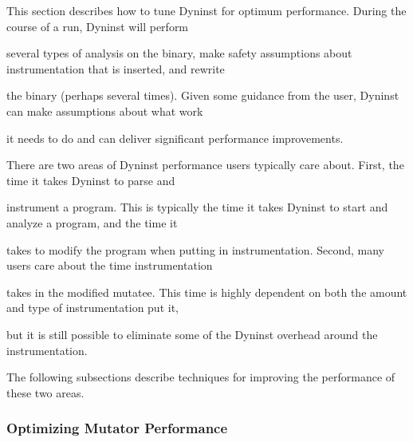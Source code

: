

\bigskip



{

This section describes how to tune Dyninst for optimum performance. During the course of a run, Dyninst will perform

several types of analysis on the binary, make safety assumptions about instrumentation that is inserted, and rewrite

the binary (perhaps several times). Given some guidance from the user, Dyninst can make assumptions about what work

it needs to do and can deliver significant performance improvements.}





\bigskip



{

There are two areas of Dyninst performance users typically care about. First, the time it takes Dyninst to parse and

instrument a program. This is typically the time it takes Dyninst to start and analyze a program, and the time it

takes to modify the program when putting in instrumentation. Second, many users care about the time instrumentation

takes in the modified mutatee. This time is highly dependent on both the amount and type of instrumentation put it,

but it is still possible to eliminate some of the Dyninst overhead around the instrumentation.}





\bigskip



{

The following subsections describe techniques for improving the performance of these two areas.}





\bigskip



\subsubsection{Optimizing Mutator Performance}



\bigskip



